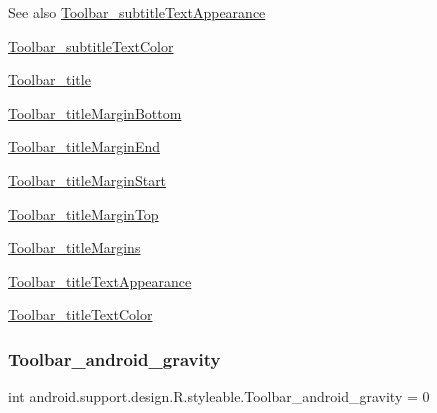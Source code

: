 \begin{DoxySeeAlso}{See also}
\hyperlink{classandroid_1_1support_1_1design_1_1R_1_1styleable_abb253180e44bdd9eff96211ecbe332cf}{Toolbar\+\_\+subtitle\+Text\+Appearance} 

\hyperlink{classandroid_1_1support_1_1design_1_1R_1_1styleable_a0924fc01dfcdf4dd5e6b63188a1248f3}{Toolbar\+\_\+subtitle\+Text\+Color} 

\hyperlink{classandroid_1_1support_1_1design_1_1R_1_1styleable_abec4f071992436f684430ab2be771dcb}{Toolbar\+\_\+title} 

\hyperlink{classandroid_1_1support_1_1design_1_1R_1_1styleable_a0a632f483c823b4ce646fd30c094cb6e}{Toolbar\+\_\+title\+Margin\+Bottom} 

\hyperlink{classandroid_1_1support_1_1design_1_1R_1_1styleable_a31063956df1fcf227bb270b3d99d655a}{Toolbar\+\_\+title\+Margin\+End} 

\hyperlink{classandroid_1_1support_1_1design_1_1R_1_1styleable_ad039c0dbf8952631ed1ef085c60c5c16}{Toolbar\+\_\+title\+Margin\+Start} 

\hyperlink{classandroid_1_1support_1_1design_1_1R_1_1styleable_a29bca0a3147a1442fad7801b4d23fc68}{Toolbar\+\_\+title\+Margin\+Top} 

\hyperlink{classandroid_1_1support_1_1design_1_1R_1_1styleable_ae49b23069bb886262bf59ab027045954}{Toolbar\+\_\+title\+Margins} 

\hyperlink{classandroid_1_1support_1_1design_1_1R_1_1styleable_aad88a5a97376d2cb38271639cec1ca2c}{Toolbar\+\_\+title\+Text\+Appearance} 

\hyperlink{classandroid_1_1support_1_1design_1_1R_1_1styleable_a604b5e782f3ef15da00397e90979933b}{Toolbar\+\_\+title\+Text\+Color} 
\end{DoxySeeAlso}
\mbox{\label{classandroid_1_1support_1_1design_1_1R_1_1styleable_a284a71ada839c36b151c703e6669cb1f}} 
\subsubsection{\texorpdfstring{Toolbar\+\_\+android\+\_\+gravity}{Toolbar\_android\_gravity}}
{\footnotesize\ttfamily int android.\+support.\+design.\+R.\+styleable.\+Toolbar\+\_\+android\+\_\+gravity = 0\hspace{0.3cm}{\ttfamily [static]}}

